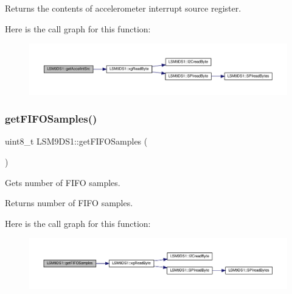 \begin{DoxyReturn}{Returns}
the contents of accelerometer interrupt source register. 
\end{DoxyReturn}
Here is the call graph for this function\+:\nopagebreak
\begin{figure}[H]
\begin{center}
\leavevmode
\includegraphics[width=350pt]{classLSM9DS1_ae42ae3b368370f977d090ba0e53c7f5c_cgraph}
\end{center}
\end{figure}
\mbox{\label{classLSM9DS1_ac03ef2ff928a25c4a80af7707cd92dc8}} 
\subsubsection{\texorpdfstring{get\+F\+I\+F\+O\+Samples()}{getFIFOSamples()}}
{\footnotesize\ttfamily uint8\+\_\+t L\+S\+M9\+D\+S1\+::get\+F\+I\+F\+O\+Samples (\begin{DoxyParamCaption}{ }\end{DoxyParamCaption})}



Gets number of F\+I\+FO samples. 

\begin{DoxyReturn}{Returns}
number of F\+I\+FO samples. 
\end{DoxyReturn}
Here is the call graph for this function\+:\nopagebreak
\begin{figure}[H]
\begin{center}
\leavevmode
\includegraphics[width=350pt]{classLSM9DS1_ac03ef2ff928a25c4a80af7707cd92dc8_cgraph}
\end{center}
\end{figure}
\mbox{\label{classLSM9DS1_aaba6696754df62a411a6a190100f9ca3}} 
